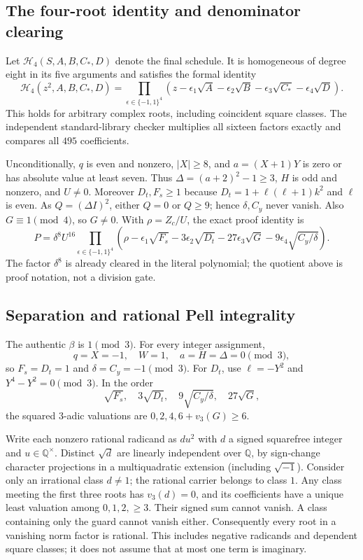 \subsection{The four-root identity and denominator clearing}
Let $\mathcal H_4(S,A,B,C_*,D)$ denote the final schedule. It is homogeneous
of degree eight in its five arguments and satisfies the formal identity
\[
 \mathcal H_4(z^2,A,B,C_*,D)=
 \prod_{\epsilon\in\{-1,1\}^4}
 (z-\epsilon_1\sqrt A-\epsilon_2\sqrt B
       -\epsilon_3\sqrt{C_*}-\epsilon_4\sqrt D).
\]
This holds for arbitrary complex roots, including coincident square classes.
The independent standard-library checker multiplies all sixteen factors
exactly and compares all $495$ coefficients.

Unconditionally, $q$ is even and nonzero, $|X|\ge8$, and
$a=(X+1)Y$ is zero or has absolute value at least seven. Thus
$\Delta=(a+2)^2-1\ge3$, $H$ is odd and nonzero, and $U\ne0$.
Moreover $D_t,F_s\ge1$ because
$D_t=1+\ell(\ell+1)k^2$ and $\ell$ is even.
As $Q=(\Delta I)^2$, either $Q=0$ or $Q\ge9$;
hence $\delta,C_y$ never vanish. Also $G\equiv1\pmod4$, so $G\ne0$.
With $\rho=Z_c/U$, the exact proof identity is
\[
 P=\delta^8U^{16}\!\prod_{\epsilon\in\{-1,1\}^4}
 \left(\rho-\epsilon_1\sqrt{F_s}-3\epsilon_2\sqrt{D_t}
       -27\epsilon_3\sqrt G-9\epsilon_4\sqrt{C_y/\delta}\right).
\]
The factor $\delta^8$ is already cleared in the literal polynomial; the
quotient above is proof notation, not a division gate.

\subsection{Separation and rational Pell integrality}
The authentic $\beta$ is $1\pmod3$. For every integer assignment,
\[
 q=X=-1,\quad W=1,\quad a=H=\Delta=0\pmod3,
\]
so $F_s=D_t=1$ and $\delta=C_y=-1\pmod3$. For $D_t$, use
$\ell=-Y^2$ and $Y^4-Y^2=0\pmod3$. In the order
\[
 \sqrt{F_s},\quad3\sqrt{D_t},\quad
 9\sqrt{C_y/\delta},\quad27\sqrt G,
\]
the squared $3$-adic valuations are $0,2,4,6+v_3(G)\ge6$.

Write each nonzero rational radicand as $du^2$ with $d$ a signed squarefree
integer and $u\in\mathbb Q^\times$. Distinct $\sqrt d$ are linearly independent
over $\mathbb Q$, by sign-change character projections in a multiquadratic
extension (including $\sqrt{-1}$). Consider only an irrational class $d\ne1$;
the rational carrier belongs to class $1$. Any class meeting the first three
roots has $v_3(d)=0$, and its coefficients have a unique least valuation among
$0,1,2,\ge3$. Their signed sum cannot vanish. A class containing only the guard
cannot vanish either. Consequently every root in a vanishing norm factor is
rational. This includes negative radicands and dependent square classes; it
does not assume that at most one term is imaginary.

